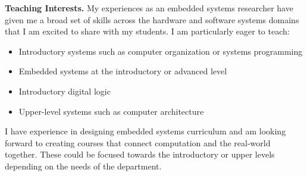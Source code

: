 \documentclass[11pt]{article} %
\begin{document}
\textbf{Teaching Interests.}
My experiences as an embedded systems researcher have given me a broad set of
skills across the hardware and software systems domains that I am excited to
share with my students. I am particularly eager to teach:
%
\begin{itemize}
  \item Introductory systems such as computer organization or systems programming
  \item Embedded systems at the introductory or advanced level
  \item Introductory digital logic
  \item Upper-level systems such as computer architecture
\end{itemize}
%
I have experience in designing embedded systems curriculum and am looking
forward to creating courses that connect computation and the real-world
together. These could be focused towards the introductory or upper levels
depending on the needs of the department.


%
\end{document}
